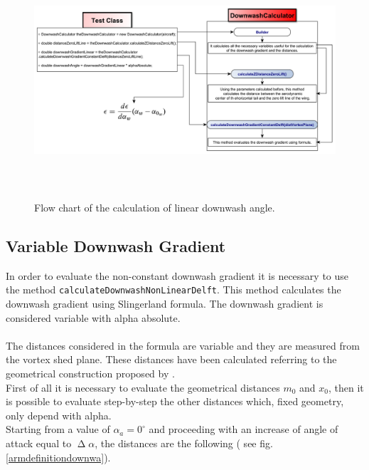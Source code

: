 \begin{figure}[H]
\centering
{\includegraphics[height=8cm, angle=90]{Immagini/linearDownwash_2.pdf}} 
\caption{Flow chart of the calculation of linear downwash angle.}
\label{flowchartangles}
\end{figure} 



\subsection{Variable Downwash Gradient}

In order to evaluate the non-constant downwash gradient it is necessary to use the method \texttt{calculateDownwashNonLinearDelft}. 
This method calculates the downwash gradient using Slingerland formula. The downwash gradient is considered variable with alpha absolute. 
\\ \\
The distances  considered in the formula are variable and they are measured from the vortex shed plane. These distances have been calculated referring to the geometrical construction proposed  by \cite{uninagiordano}.\\
First of all it is necessary to evaluate the geometrical distances $m_0$ and $x_0$, then it is possible to evaluate step-by-step the other distances which, fixed geometry, only depend with alpha.\\ Starting from a value of  $\alpha_a = 0^{\circ}$ and proceeding with an increase of angle of attack equal to $ \upDelta \alpha$, the distances are the following ( see fig. \ref{armdefinitiondownwa}).

